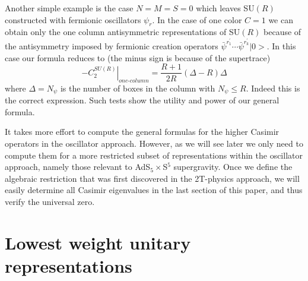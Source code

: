 \documentclass[a4paper,aps,preprint,nofootinbib]{revtex4}
\begin{document}
Another simple example is the case $N=M=S=0$ which leaves SU$\left( R\right)
$ constructed with fermionic oscillators $\psi_{r}$. In the case of one
color $C=1$ we can obtain only the one column antisymmetric representations
of SU$\left( R\right) $ because of the antisymmetry imposed by fermionic
creation operators $\bar{\psi}^{r_{1}^{\prime}}\cdots\bar{\psi}%
^{r_{k}^{\prime}}|0>$. In this case our formula reduces to (the minus sign
is because of the supertrace)%
\begin{equation}
-\left. C_{2}^{SU\left( R\right) }\right\vert _{one\text{-}column}=\frac{R+1
}{2R}\left( \Delta-R\right) \Delta
\end{equation}
where $\Delta=N_{\psi}$ is the number of boxes in the column with $N_{\psi
}\leq R.$ Indeed this is the correct expression. Such tests show the utility
and power of our general formula.

It takes more effort to compute the general formulas for the
higher Casimir operators in the oscillator approach. However, as
we will see later we only need to compute them for a more
restricted subset of representations within the oscillator
approach, namely those relevant to AdS$_5\times$S$^5$
supergravity. Once we define the algebraic restriction that was
first discovered in the 2T-physics approach, we will easily
determine all Casimir eigenvalues in the last section of this
paper, and thus verify the universal zero.

\section{Lowest weight unitary representations}
\end{document}
